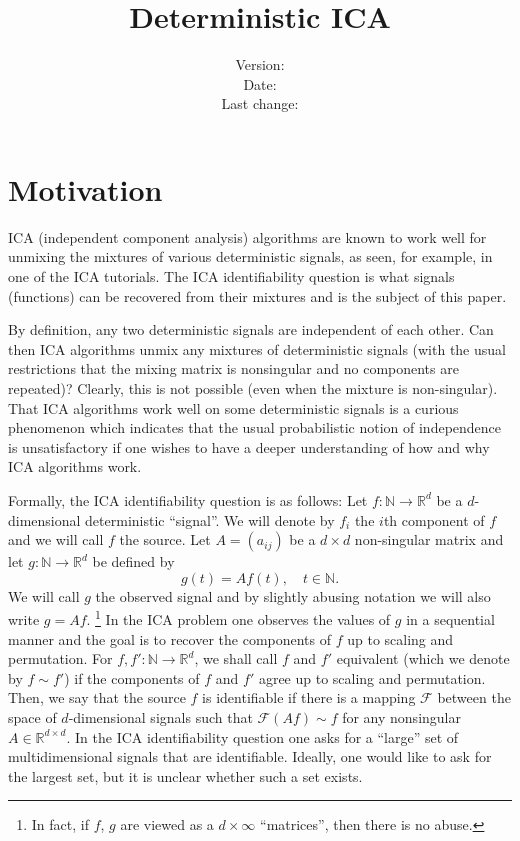 \documentclass[english]{article} %
\title{Deterministic ICA}
\author{
}
\date{
Version: \svnrev\\
Date: \svndate\\
Last change: \svnauthor
}
\newcommand{\todoc}[2][]{\todo[color=Apricot,#1]{#2}}
\newcommand{\ra}{\rightarrow}
\newcommand{\real}{\mathbb{R}}
\renewcommand{\natural}{\mathbb{N}}
\theoremstyle{definition}
\newcommand{\FF}{\mathcal{F}}
\begin{document}
\maketitle
\begin{abstract}

\end{abstract}

\section{Motivation}
\label{sec:motivation}
ICA (independent component analysis) algorithms are known to work well for unmixing the mixtures of various deterministic signals, as seen,  for example, in one of the ICA tutorials. \todoc{Citation?}
The ICA identifiability question is what signals (functions) can be recovered from their mixtures and is the subject of this paper.

By definition, any two deterministic signals are independent of each other. Can then ICA algorithms unmix any mixtures of deterministic signals (with the usual restrictions that the mixing matrix is nonsingular and no components are repeated)? 
Clearly, this is not possible (even when the mixture is non-singular).
That ICA algorithms work well on some deterministic signals is a curious phenomenon which indicates that the usual probabilistic notion of independence is unsatisfactory if one wishes to have a deeper understanding of how and why ICA algorithms work.

Formally, the ICA identifiability question is as follows:
Let $f:\natural \ra \real^d$ be a $d$-dimensional deterministic ``signal''. 
We will denote by $f_i$ the $i$th component of $f$ and we will call $f$ the source.
Let $A = (a_{ij})$ be a $d\times d$ non-singular matrix and let $g:\natural \ra \real^d$ be defined by
\[
g(t) = A f(t), \quad t\in \natural.
\]
We will call $g$ the observed signal and by slightly abusing notation we will also write $g = A f$.%
\footnote{In fact, if $f$, $g$ are viewed as a $d\times \infty$ ``matrices'', then there is no abuse.}
In the ICA problem one observes the values of $g$ in a sequential manner and the goal is to recover the components of $f$ up to scaling and permutation. For $f,f':\natural \ra \real^d$, we shall call $f$ and $f'$ equivalent (which we denote by $f\sim f'$) if the components of $f$ and $f'$ agree up to scaling and permutation.
Then, we say that the source $f$ is identifiable if there is a mapping $\FF$ between the space of $d$-dimensional signals such that  $\FF( Af )\sim f$ for any nonsingular $A\in \real^{d\times d}$.
In the ICA identifiability question one asks for a ``large'' set of multidimensional signals that are identifiable. Ideally, one would like to ask for the largest set, but it is unclear whether such a set exists. \todoc{Does it?}
\end{document}
